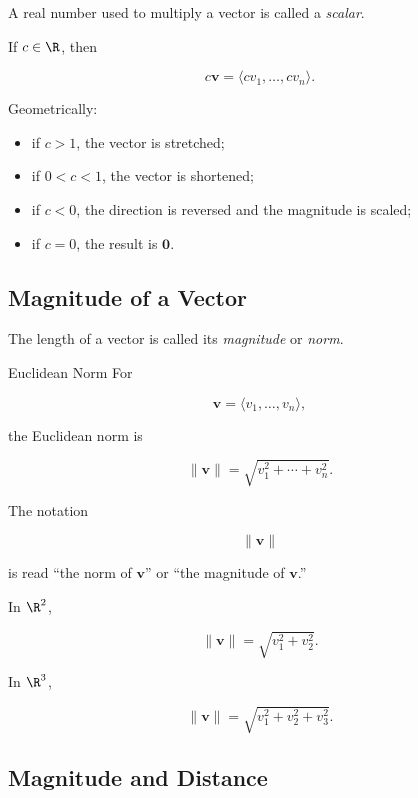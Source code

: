 A real number used to multiply a vector is called a \emph{scalar}.

If \(c\in\R\), then

\[
\boxed{
c\mathbf{v}
=
\langle
cv_1,\ldots,cv_n
\rangle.
}
\]

Geometrically:

\begin{itemize}
    \item if \(c>1\), the vector is stretched;
    \item if \(0<c<1\), the vector is shortened;
    \item if \(c<0\), the direction is reversed and the magnitude is scaled;
    \item if \(c=0\), the result is \(\mathbf{0}\).
\end{itemize}

\subsection{Magnitude of a Vector}
\label{subsec:vector-magnitude}

The length of a vector is called its \emph{magnitude} or \emph{norm}.

\begin{definitionbox}{Euclidean Norm}
For

\[ \mathbf{v}=\langle v_1,\ldots,v_n\rangle, \]

the Euclidean norm is

\[ \boxed{\|\mathbf{v}\|=\sqrt{v_1^2+\cdots+v_n^2}.} \]
\end{definitionbox}

The notation

\[ \|\mathbf{v}\| \]

is read ``the norm of \(\mathbf{v}\)'' or ``the magnitude of
\(\mathbf{v}\).''

In \(\R^2\),

\[ \|\mathbf{v}\|=\sqrt{v_1^2+v_2^2}. \]

In \(\R^3\),

\[ \|\mathbf{v}\|=\sqrt{v_1^2+v_2^2+v_3^2}. \]

\subsection{Magnitude and Distance}
\label{subsec:magnitude-and-distance}

